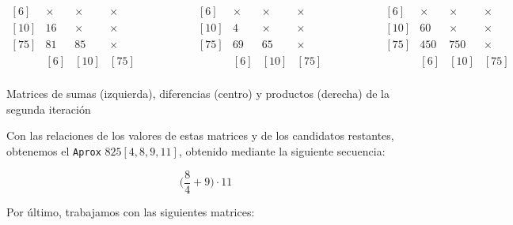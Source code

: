 \begin{center}
$\begin{matrix}
[6]  & \times & \times & \times \\
[10] & 16     & \times & \times \\
[75] & 81     & 85     & \times \\
     &   [6]  &  [10]  &  [75]  \\
\end{matrix}
\ \ \ \ \ \ \ \ \ \ \ \ \ \ \ \ \ \ \ \ \ \ \begin{matrix}
[6]  & \times & \times & \times \\
[10] & 4      & \times & \times \\
[75] & 69     & 65     & \times \\
     &   [6]  &  [10]  &  [75]  \\
\end{matrix}
\ \ \ \ \ \ \ \ \ \ \ \ \ \ \ \ \ \ \ \ \ \ \begin{matrix}
[6]  & \times & \times & \times \\
[10] & 60     & \times & \times \\
[75] & 450    & 750    & \times \\
     &   [6]  &  [10]  &  [75]  \\
\end{matrix}$

Matrices de sumas (izquierda), diferencias (centro) y productos (derecha) de la segunda iteración
\end{center}

Con las relaciones de los valores de estas matrices y de los candidatos restantes, obtenemos el \texttt{Aprox} $825[4,8,9,11]$, obtenido mediante la siguiente secuencia:

\begin{center}
\[\bigg(\frac{8}{4}+9\bigg)\cdot11\]
\end{center}

\pagebreak

Por último, trabajamos con las siguientes matrices:

